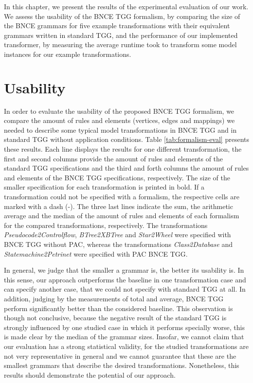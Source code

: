 In this chapter, we present the results of the experimental evaluation of our work. We assess the usability of the BNCE TGG formalism, by comparing the size of the BNCE grammars for five example transformations with their equivalent grammars written in standard TGG, and the performance of our implemented transformer, by measuring the average runtime took to transform some model instances for our example transformations.

\section{Usability}
\label{sec:eval-usability}
In order to evaluate the usability of the proposed BNCE TGG formalism, we compare the amount of rules and elements (vertices, edges and mappings) we needed to describe some typical model transformations in BNCE TGG and in standard TGG without application conditions. Table \ref{tab:formalism-eval} presents these results. Each line displays the results for one different transformation, the first and second columns provide the amount of rules and elements of the standard TGG specifications and the third and forth columns the amount of rules and elements of the BNCE TGG specifications, respectively. The size of the smaller specification for each transformation is printed in bold. If a transformation could not be specified with a formalism, the respective cells are marked with a dash (-). The three last lines indicate the sum, the arithmetic average and the median of the amount of rules and elements of each formalism for the compared transformations, respectively. The transformations \emph{Pseudocode2Controlflow}, \emph{BTree2XBTree}	and \emph{Star2Wheel} were specified with BNCE TGG without PAC, whereas the transformations \emph{Class2Database} and \emph{Statemachine2Petrinet} were specified with PAC BNCE TGG.

In general, we judge that the smaller a grammar is, the better its usability is. In this sense, our approach outperforms the baseline in one transformation case and can specify another case, that we could not specify with standard TGG at all. In addition, judging by the measurements of total and average, BNCE TGG perform significantly better than the considered baseline. This observation is though not conclusive, because the negative result of the standard TGG is strongly influenced by one studied case in which it performs specially worse, this is made clear by the median of the grammar sizes. Insofar, we cannot claim that our evaluation has a strong statistical validity, for the studied transformations are not very representative in general and we cannot guarantee that these are the smallest grammars that describe the desired transformations. Nonetheless, this results should demonstrate the potential of our approach.

